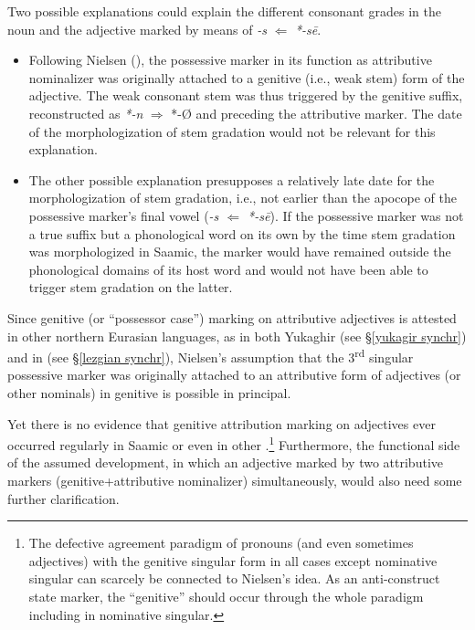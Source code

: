 {\largerpage
Two possible explanations could explain the different consonant grades in the noun and the adjective marked by means of \textit{-s} $\Leftarrow$ \textit{*-sē}.
\begin{itemize}
\item Following Nielsen (\citeyear{nielsen1945b}), the possessive marker in its function as attributive nominalizer was originally attached to a genitive (i.e., weak stem) form of the adjective. The weak consonant stem was thus triggered by the genitive suffix, reconstructed as  \textit{*-n} $\Rightarrow$  \mbox{*-Ø} \citep[65]{sammallahti1998b} and preceding the attributive marker. The date of the morphologization of stem gradation would not be relevant for this explanation.
\item The other possible explanation presupposes a relatively late date for the morphologization of stem gradation, i.e., not earlier than the apocope of the possessive marker's final vowel (\textit{-s $\Leftarrow$ *-sē}). If the possessive marker was not a true suffix but a phonological word on its own by the time stem gradation was morphologized in Saamic, the marker would have remained outside the phonological domains of its host word and would not have been able to trigger stem gradation on the latter. 
\end{itemize}

Since genitive (or “possessor case”) marking on attributive adjectives is attested in other northern Eurasian languages, as in both Yukaghir (see \S\ref{yukagir synchr}) and in  (see \S\ref{lezgian synchr}), Nielsen's assumption that the 3\textsuperscript{rd} singular possessive marker was originally attached to an attributive form of adjectives (or other nominals) in genitive is possible in principal.

Yet there is no evidence that genitive attribution marking on adjectives ever occurred regularly in Saamic or even in other .\footnote{The defective agreement paradigm of pronouns (and even sometimes adjectives) with the genitive singular form in all cases except nominative singular can scarcely be connected to Nielsen's idea. As an anti\hyp{}construct state marker, the “genitive” should occur through the whole paradigm including in nominative singular.} Furthermore, the functional side of the assumed development, in which an adjective marked by two attributive markers (genitive+attributive nominalizer) simultaneously, would also need some further clarification.

}
